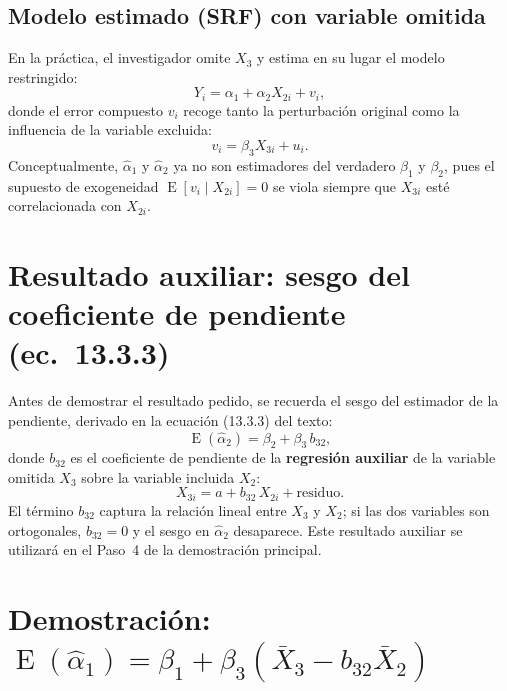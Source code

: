 \documentclass[12pt, letterpaper]{article}
\newcommand{\E}{\operatorname{E}}
\begin{document}
\subsection{Modelo estimado (SRF) con variable omitida}

En la práctica, el investigador omite $X_3$ y estima en su lugar el
modelo restringido:
\begin{equation}
  Y_i = \alpha_1 + \alpha_2 X_{2i} + v_i,
  \label{eq:omitido}
\end{equation}
donde el error compuesto $v_i$ recoge tanto la perturbación original como
la influencia de la variable excluida:
\[
  v_i = \beta_3 X_{3i} + u_i.
\]
Conceptualmente, $\hat{\alpha}_1$ y $\hat{\alpha}_2$ ya no son estimadores
del verdadero $\beta_1$ y $\beta_2$, pues el supuesto de exogeneidad
$\E[v_i \mid X_{2i}] = 0$ se viola siempre que $X_{3i}$ esté correlacionada
con $X_{2i}$.

\section{Resultado auxiliar: sesgo del coeficiente de pendiente (ec.\ 13.3.3)}

Antes de demostrar el resultado pedido, se recuerda el sesgo del estimador
de la pendiente, derivado en la ecuación (13.3.3) del texto:
\begin{equation}
  \E(\hat{\alpha}_2) = \beta_2 + \beta_3\, b_{32},
  \label{eq:sesgo_pendiente}
\end{equation}
donde $b_{32}$ es el coeficiente de pendiente de la \textbf{regresión auxiliar}
de la variable omitida $X_3$ sobre la variable incluida $X_2$:
\begin{equation}
  X_{3i} = a + b_{32}\, X_{2i} + \text{residuo}.
  \label{eq:reg_auxiliar}
\end{equation}
El término $b_{32}$ captura la relación lineal entre $X_3$ y $X_2$;
si las dos variables son ortogonales, $b_{32} = 0$ y el sesgo en
$\hat{\alpha}_2$ desaparece. Este resultado auxiliar se utilizará en el
Paso~4 de la demostración principal.

\section{Demostración: $\E(\hat{\alpha}_1) = \beta_1 + \beta_3(\bar{X}_3 - b_{32}\bar{X}_2)$}
\end{document}
